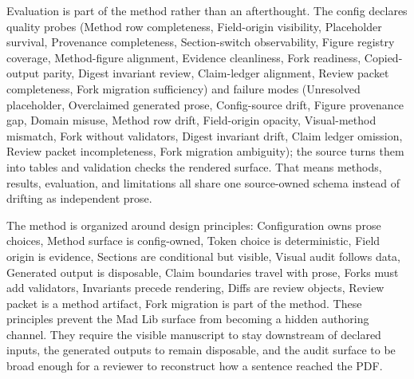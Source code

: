 \documentclass[
  english,
]{article}
\begin{document}
Evaluation is part of the method rather than an afterthought. The config
declares quality probes (Method row completeness, Field-origin
visibility, Placeholder survival, Provenance completeness,
Section-switch observability, Figure registry coverage, Method-figure
alignment, Evidence cleanliness, Fork readiness, Copied-output parity,
Digest invariant review, Claim-ledger alignment, Review packet
completeness, Fork migration sufficiency) and failure modes (Unresolved
placeholder, Overclaimed generated prose, Config-source drift, Figure
provenance gap, Domain misuse, Method row drift, Field-origin opacity,
Visual-method mismatch, Fork without validators, Digest invariant drift,
Claim ledger omission, Review packet incompleteness, Fork migration
ambiguity); the source turns them into tables and validation checks the
rendered surface. That means methods, results, evaluation, and
limitations all share one source-owned schema instead of drifting as
independent prose.

The method is organized around design principles: Configuration owns
prose choices, Method surface is config-owned, Token choice is
deterministic, Field origin is evidence, Sections are conditional but
visible, Visual audit follows data, Generated output is disposable,
Claim boundaries travel with prose, Forks must add validators,
Invariants precede rendering, Diffs are review objects, Review packet is
a method artifact, Fork migration is part of the method. These
principles prevent the Mad Lib surface from becoming a hidden authoring
channel. They require the visible manuscript to stay downstream of
declared inputs, the generated outputs to remain disposable, and the
audit surface to be broad enough for a reviewer to reconstruct how a
sentence reached the PDF.
\end{document}
